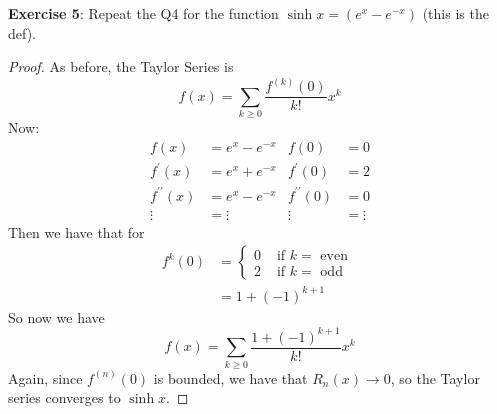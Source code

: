\documentclass{article}
\begin{document}
\textbf{Exercise 5}: Repeat the Q4 for the function $\sinh{x} = (e^{x} - e^{-x})$ (this is the def).
    \begin{proof}
        As before, the Taylor Series is
            \begin{equation*}
                f(x) = \sum_{k \geq 0}\dfrac{f^{(k)}(0)}{k!}x^{k}
            \end{equation*}
        Now:
            \begin{align*}
                f(x)                &= e^{x} - e^{-x} & f(0)                &= 0      \\
                f^{\prime}(x)       &= e^{x} + e^{-x} & f^{\prime}(0)       &= 2      \\
                f^{\prime\prime}(x) &= e^{x} - e^{-x} & f^{\prime\prime}(0) &= 0      \\
                \vdots              &= \vdots         & \vdots              &= \vdots   
            \end{align*}
        Then we have that for
            \begin{align*}
                f^{k}(0) &= \begin{cases}
                    0                &\text{ if } k = \text{ even } \\
                    2 &\text{ if } k = \text{ odd }   
                \end{cases} \\
                      &= 1 + (-1)^{k + 1}
            \end{align*}
        So now we have
            \begin{equation*}
                f(x) = \sum_{k \geq 0}\dfrac{1 + (-1)^{k + 1}}{k!}x^{k}
            \end{equation*}
        Again, since $f^{(n)}(0)$ is bounded, we have that $R_{n}(x) \rightarrow 0$, so the Taylor series converges to $\sinh{x}$.
    \end{proof}
\end{document}
